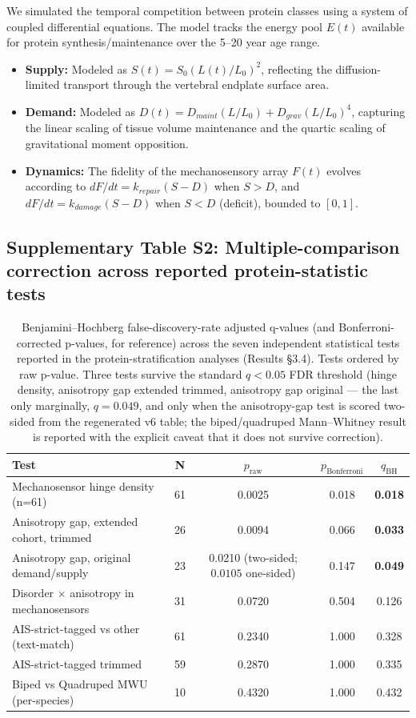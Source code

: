 We simulated the temporal competition between protein classes using a system of coupled differential equations. The model tracks the energy pool $E(t)$ available for protein synthesis/maintenance over the 5--20 year age range.
\begin{itemize}
    \item \textbf{Supply:} Modeled as $S(t) = S_0 (L(t)/L_0)^2$, reflecting the diffusion-limited transport through the vertebral endplate surface area.
    \item \textbf{Demand:} Modeled as $D(t) = D_{maint} (L/L_0) + D_{grav} (L/L_0)^4$, capturing the linear scaling of tissue volume maintenance and the quartic scaling of gravitational moment opposition.
    \item \textbf{Dynamics:} The fidelity of the mechanosensory array $F(t)$ evolves according to $dF/dt = k_{repair}(S - D)$ when $S > D$, and $dF/dt = k_{damage}(S - D)$ when $S < D$ (deficit), bounded to $[0, 1]$.
\end{itemize}


\subsection{Supplementary Table S2: Multiple-comparison correction across reported protein-statistic tests}

\begin{table}[h!]
\centering
\caption{Benjamini--Hochberg false-discovery-rate adjusted q-values (and Bonferroni-corrected p-values, for reference) across the seven independent statistical tests reported in the protein-stratification analyses (Results §3.4). Tests ordered by raw p-value. Three tests survive the standard $q < 0.05$ FDR threshold (hinge density, anisotropy gap extended trimmed, anisotropy gap original --- the last only marginally, $q = 0.049$, and only when the anisotropy-gap test is scored two-sided from the regenerated v6 table; the biped/quadruped Mann--Whitney result is reported with the explicit caveat that it does not survive correction).}
\label{tab:S2}
\small
\begin{tabular}{lcccc}
\toprule
\textbf{Test} & \textbf{N} & \textbf{$p_{\text{raw}}$} & \textbf{$p_{\text{Bonferroni}}$} & \textbf{$q_{\text{BH}}$} \\
\midrule
Mechanosensor hinge density (n=61) & 61 & 0.0025 & 0.018 & \textbf{0.018} \\
Anisotropy gap, extended cohort, trimmed & 26 & 0.0094 & 0.066 & \textbf{0.033} \\
Anisotropy gap, original demand/supply & 23 & 0.0210 (two-sided; $0.0105$ one-sided) & 0.147 & \textbf{0.049} \\
Disorder $\times$ anisotropy in mechanosensors & 31 & 0.0720 & 0.504 & 0.126 \\
AIS-strict-tagged vs other (text-match) & 61 & 0.2340 & 1.000 & 0.328 \\
AIS-strict-tagged trimmed & 59 & 0.2870 & 1.000 & 0.335 \\
Biped vs Quadruped MWU (per-species) & 10 & 0.4320 & 1.000 & 0.432 \\
\bottomrule
\end{tabular}
\end{table}

